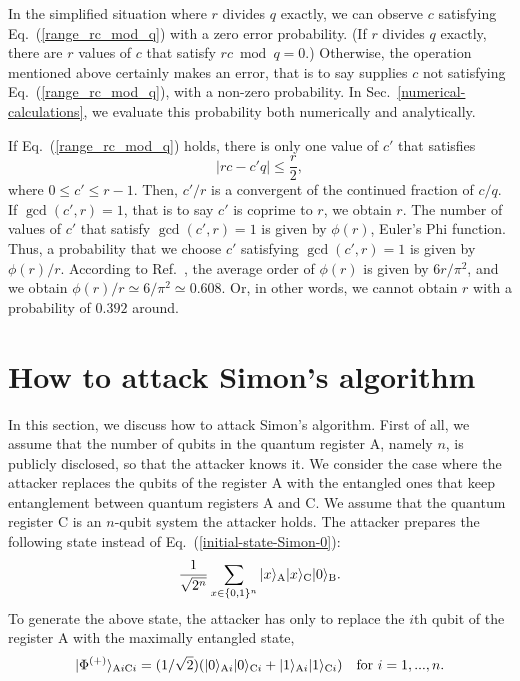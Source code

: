 \documentclass[12pt]{article}
\begin{document}
In the simplified situation where $r$ divides $q$ exactly,
we can observe $c$ satisfying Eq.~(\ref{range_rc_mod_q}) with a zero error probability.
(If $r$ divides $q$ exactly,
there are $r$ values of $c$ that satisfy $rc \bmod q=0$.)
Otherwise,
the operation mentioned above certainly makes an error,
that is to say supplies $c$ not satisfying Eq.~(\ref{range_rc_mod_q}),
with a non-zero probability.
In Sec.~\ref{numerical-calculations},
we evaluate this probability both numerically and analytically.

If Eq.~(\ref{range_rc_mod_q}) holds,
there is only one value of $c'$ that satisfies
\begin{equation}
|rc-c'q|\leq\frac{r}{2},
\label{condition-rc}
\end{equation}
where $0\leq c'\leq r-1$.
Then,
$c'/r$ is a convergent of the continued fraction of $c/q$.
If $\gcd(c',r)=1$,
that is to say $c'$ is coprime to $r$,
we obtain $r$.
The number of values of $c'$ that satisfy $\gcd(c',r)=1$ is given by $\phi(r)$, Euler's Phi function.
Thus,
a probability that we choose $c'$ satisfying $\gcd(c',r)=1$ is given by $\phi(r)/r$.
According to Ref.~\cite{Hardy1975},
the average order of $\phi(r)$ is given by $6r/\pi^{2}$,
and we obtain
$\phi(r)/r\simeq 6/\pi^{2}\simeq 0.608$.
Or, in other words,
we cannot obtain $r$ with a probability of $0.392$ around.

\section{\label{section-attack-Simon}How to attack Simon's algorithm}
In this section,
we discuss how to attack Simon's algorithm.
First of all,
we assume that the number of qubits in the quantum register A,
namely $n$,
is publicly disclosed,
so that the attacker knows it.
We consider the case where the attacker replaces the qubits of the register A
with the entangled ones that keep entanglement between quantum registers A and C.
We assume that the quantum register C is an $n$-qubit system the attacker holds.
The attacker prepares the following state instead of Eq.~(\ref{initial-state-Simon-0}):
\begin{equation}
\frac{1}{\sqrt{2^{n}}}
\sum_{x\in\{0,1\}^{n}}
|x\rangle_{\mbox{\scriptsize A}}
|x\rangle_{\mbox{\scriptsize C}}
|0\rangle_{\mbox{\scriptsize B}}.
\label{initial-state-Simon-attacker-0}
\end{equation}
To generate the above state,
the attacker has only to replace the $i$th qubit of the register A with the maximally entangled state,
\begin{equation}
|\Phi^{(+)}\rangle_{\mbox{\scriptsize A}i\mbox{\scriptsize C}i}
=
(1/\sqrt{2})
(|0\rangle_{\mbox{\scriptsize A}i}|0\rangle_{\mbox{\scriptsize C}i}
+
|1\rangle_{\mbox{\scriptsize A}i}|1\rangle_{\mbox{\scriptsize C}i})
\quad
\mbox{for $i=1,...,n$}.
\end{equation}
\end{document}
